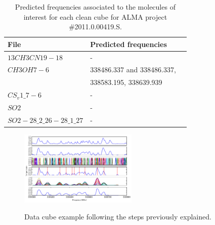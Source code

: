 \begin{center}
	\begin{table}
		\begin{tabular}{ | l | l | l | }
			\hline
			{\bf File } & {\bf Predicted frequencies }  \\ \hline
			$13CH3CN19-18$ 				& - \\ \hline
			$CH3OH7-6$ 					& 338486.337 and 338486.337, \\
					 					& 338583.195, 338639.939 \\ \hline
			$CS_v1\_7-6$ 				& - \\ \hline
			$SO2$ 		 				& -  \\ \hline
			$SO2-28\_2\_26-28\_1\_27$ 	& -   \\ \hline
			\hline
		\end{tabular}
		\caption{ Predicted frequencies associated to the molecules of interest for each clean cube for ALMA project \#2011.0.00419.S.}
		\label{tab:real-results}
	\end{table}
\end{center}

\begin{figure}
	\begin{center}
		\label{fig:experiment}	
				\includegraphics[width=0.5\textwidth]{images/experiment}%
		\caption{Data cube example following the steps previously explained.}
	\end{center}
\end{figure}






